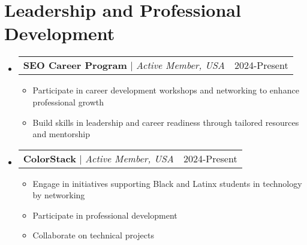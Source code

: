 \documentclass[letterpaper,11pt]{article}
\makeatletter
\newcommand{\resumeItem}[1]{
  \item\small{
    {#1 \vspace{-2pt}}
  }
}
\newcommand{\resumeProjectHeading}[2]{
    \item
    \begin{tabular*}{0.97\textwidth}{l@{\extracolsep{\fill}}r}
      \small#1 & #2 \\
    \end{tabular*}\vspace{-7pt}
}
\newcommand{\resumeSubHeadingListStart}{\begin{itemize}[leftmargin=0.15in, label={}]}
\newcommand{\resumeSubHeadingListEnd}{\end{itemize}}
\newcommand{\resumeItemListStart}{\begin{itemize}}
\newcommand{\resumeItemListEnd}{\end{itemize}\vspace{-5pt}}
\makeatother
\begin{document}
 \section{Leadership and Professional Development}
    \resumeSubHeadingListStart
        \resumeProjectHeading
          {\textbf{SEO Career Program} $|$ \emph{Active Member, USA}}{2024-Present}
          \resumeItemListStart
            \resumeItem{Participate in career development workshops and networking to enhance professional growth}
            \resumeItem{Build skills in leadership and career readiness through tailored resources and mentorship}
          \resumeItemListEnd
      \resumeProjectHeading
          {\textbf{ColorStack} $|$ \emph{Active Member, USA}}{2024-Present}
          \resumeItemListStart
            \resumeItem{Engage in initiatives supporting Black and Latinx students in technology by networking}
            \resumeItem{Participate in professional development}
            \resumeItem{Collaborate on technical projects}
          \resumeItemListEnd          
    \resumeSubHeadingListEnd

\end{document}
